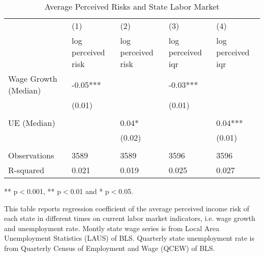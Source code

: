 	
	\begin{table}[ht]
		\centering
		\begin{adjustbox}{width=0.9\textwidth}
			\begin{threeparttable}
			\caption{Average Perceived Risks and State Labor Market}
			\label{macro_corr_he_state}
			\begin{tabular}{lllll}
					\hline 
				& (1)                & (2)                & (3)               & (4)               \\
				& log perceived risk & log perceived risk & log perceived iqr & log perceived iqr \\
				\hline 
				Wage Growth (Median) & -0.05***           &                    & -0.03***          &                   \\
				& (0.01)             &                    & (0.01)            &                   \\
				&                    &                    &                   &                   \\
				UE (Median)          &                    & 0.04*              &                   & 0.04***           \\
				&                    & (0.02)             &                   & (0.01)            \\
				&                    &                    &                   &                   \\
					\hline 
				Observations         & 3589               & 3589               & 3596              & 3596              \\
				R-squared            & 0.021              & 0.019              & 0.025             & 0.027             \\
				\hline      
			\end{tabular}
			
				\begin{tablenotes}
					\item *** p$<$0.001, ** p$<$0.01 and * p$<$0.05.
					\item This table reports regression coefficient of the average perceived income risk of each state in different times on current labor market indicators, i.e. wage growth and unemployment rate. Montly state wage series is from Local Area Unemployment Statistics (LAUS) of BLS. Quarterly state unemployment rate is from Quarterly Census of Employment and Wage (QCEW) of BLS. 
				\end{tablenotes}
			\end{threeparttable}
		\end{adjustbox}
	\end{table}
\clearpage


